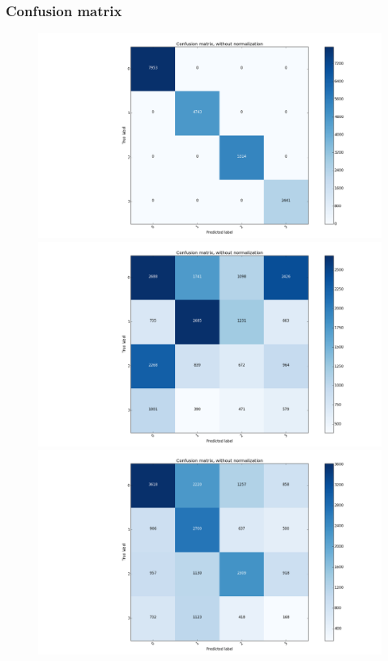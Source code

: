 \documentclass{beamer}
\begin{document}
\begin{frame}
\frametitle{Confusion matrix}
\begin{figure} 
  \label{confusion} 
  \begin{minipage}[b]{0.5\linewidth}
    \centering
    \includegraphics[width=1\linewidth]{../REPORT/Figures_Mik/label_distribution.png} 
    \vspace{2ex}
  \end{minipage}%
  \begin{minipage}[b]{0.5\linewidth}
    \centering
    \includegraphics[width=1\linewidth]{../REPORT/Figures_Mik/kmeans2.png} 
    \vspace{2ex}
  \end{minipage} 
  \begin{minipage}[b]{0.5\linewidth}
    \centering
    \includegraphics[width=1\linewidth]{../REPORT/Figures_Mik/bestModel2.png} 

\end{minipage}
\end{figure}
\end{frame}
\end{document}
